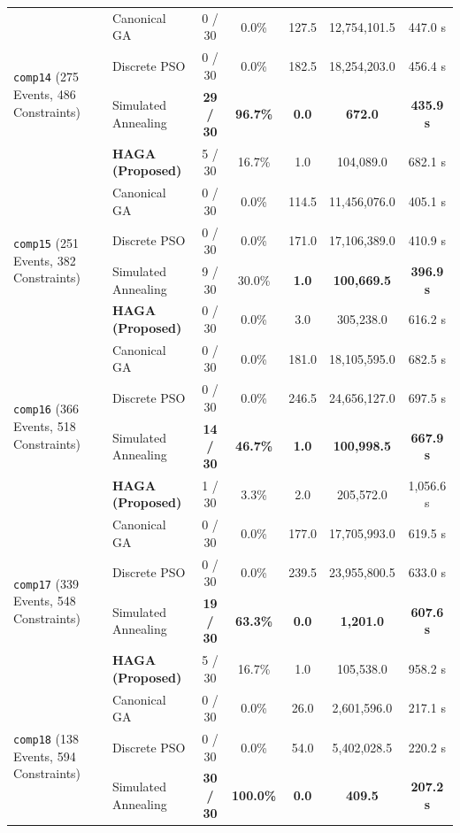 \documentclass[journal]{IEEEtran}
\begin{document}
\begin{table}[!t]
{\begin{tabular}{ll c c c c c}
\midrule
\multirow{4}{*}{\texttt{comp14} (275 Events, 486 Constraints)} 
& Canonical GA        & 0 / 30 & 0.0\%  & 127.5 & 12,754,101.5 & 447.0 s \\
& Discrete PSO        & 0 / 30 & 0.0\%  & 182.5 & 18,254,203.0 & 456.4 s \\
& Simulated Annealing & \textbf{29 / 30} & \textbf{96.7\%} & \textbf{0.0} & \textbf{672.0} & \textbf{435.9 s} \\
& \textbf{HAGA (Proposed)} & 5 / 30 & 16.7\% & 1.0 & 104,089.0 & 682.1 s \\
\midrule
\multirow{4}{*}{\texttt{comp15} (251 Events, 382 Constraints)} 
& Canonical GA        & 0 / 30 & 0.0\%  & 114.5 & 11,456,076.0 & 405.1 s \\
& Discrete PSO        & 0 / 30 & 0.0\%  & 171.0 & 17,106,389.0 & 410.9 s \\
& Simulated Annealing & 9 / 30 & 30.0\% & \textbf{1.0} & \textbf{100,669.5} & \textbf{396.9 s} \\
& \textbf{HAGA (Proposed)} & 0 / 30 & 0.0\%  & 3.0 & 305,238.0 & 616.2 s \\
\midrule
\multirow{4}{*}{\texttt{comp16} (366 Events, 518 Constraints)} 
& Canonical GA        & 0 / 30 & 0.0\% & 181.0 & 18,105,595.0 & 682.5 s \\
& Discrete PSO        & 0 / 30 & 0.0\% & 246.5 & 24,656,127.0 & 697.5 s \\
& Simulated Annealing & \textbf{14 / 30} & \textbf{46.7\%} & \textbf{1.0} & \textbf{100,998.5} & \textbf{667.9 s} \\
& \textbf{HAGA (Proposed)} & 1 / 30 & 3.3\% & 2.0 & 205,572.0 & 1,056.6 s \\
\midrule
\multirow{4}{*}{\texttt{comp17} (339 Events, 548 Constraints)} 
& Canonical GA        & 0 / 30 & 0.0\% & 177.0 & 17,705,993.0 & 619.5 s \\
& Discrete PSO        & 0 / 30 & 0.0\% & 239.5 & 23,955,800.5 & 633.0 s \\
& Simulated Annealing & \textbf{19 / 30} & \textbf{63.3\%} & \textbf{0.0} & \textbf{1,201.0} & \textbf{607.6 s} \\
& \textbf{HAGA (Proposed)} & 5 / 30 & 16.7\% & 1.0 & 105,538.0 & 958.2 s \\
\midrule
\multirow{4}{*}{\texttt{comp18} (138 Events, 594 Constraints)} 
& Canonical GA        & 0 / 30 & 0.0\%  & 26.0 & 2,601,596.0 & 217.1 s \\
& Discrete PSO        & 0 / 30 & 0.0\%  & 54.0 & 5,402,028.5 & 220.2 s \\
& Simulated Annealing & \textbf{30 / 30} & \textbf{100.0\%} & \textbf{0.0} & \textbf{409.5} & \textbf{207.2 s} \\

\end{tabular}}
\end{table}
\end{document}
